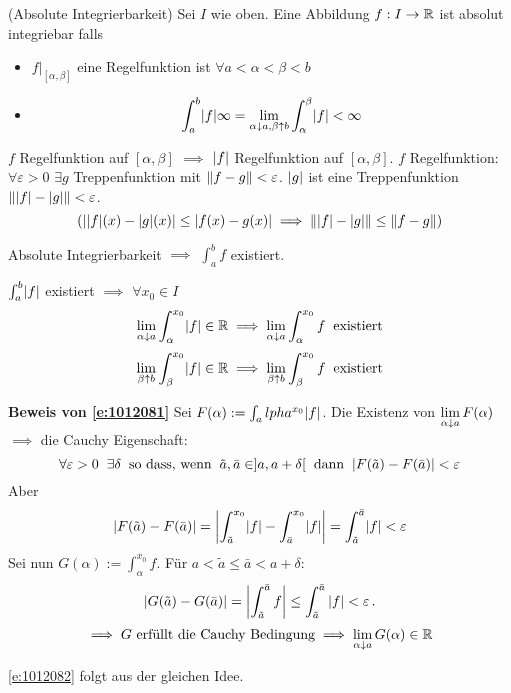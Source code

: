 \begin{Def}{(Absolute Integrierbarkeit)}
Sei $I$ wie oben. Eine Abbildung $f:I\to\mathbb{R}$  ist absolut integriebar falls
  \begin{itemize}
    \item $f|_{[\alpha,\beta]}$ eine Regelfunktion ist $\forall a<\alpha<\beta<b$
    \item 
      \[\int_a^b\mathopen| f \mathclose|\infty =\lim_{\alpha\downarrow a, \beta\uparrow b} \int_\alpha^\beta\mathopen| f \mathclose|
<\infty\]
  \end{itemize}
\end{Def}
\begin{Bem}
  $f$ Regelfunktion auf $[\alpha,\beta]$ $\implies$ $\mathopen| f \mathclose|$ Regelfunktion auf $[\alpha,\beta]$. $f$ Regelfunktion: $\forall \varepsilon>0$ $\exists g$ Treppenfunktion mit $\left\| f-g \right\|<\varepsilon$. $\mathopen| g \mathclose|$ ist eine Treppenfunktion $\left\| \mathopen| f \mathclose|-\mathopen| g \mathclose| \right\|<\varepsilon$.
  \[\left( \mathopen| \mathopen| f \mathclose|(x)-\mathopen| g \mathclose|(x) \mathclose|\leq\mathopen| f(x)-g(x) \mathclose|\implies \left\| \mathopen| f \mathclose|-\mathopen| g \mathclose| \right\|\leq\left\| f-g \right\| \right)\]
\end{Bem}
\begin{Sat}
  Absolute Integrierbarkeit $\implies$ $\int_a^b f$ existiert.
\end{Sat}
\begin{Bew}
  $\int_a^b\mathopen| f \mathclose|$ existiert $\implies$ $\forall x_0\in I$
  \begin{equation}\label{e:1012081}
    \displaystyle\lim_{\alpha\downarrow a}\int_\alpha^{x_0}\mathopen| f \mathclose|\in\mathbb{R}\implies\displaystyle\lim_{\alpha\downarrow a}
\int_\alpha^{x_0}f\hspace{2mm}\text{existiert}
  \end{equation}
  \begin{equation}\label{e:1012082}
    \displaystyle\lim_{\beta\uparrow b}\int_\beta^{x_0}\mathopen| f \mathclose|\in\mathbb{R}\implies\displaystyle\lim_{\beta\uparrow b}\int_\beta^{x_0}f\hspace{2mm}\text{existiert}
  \end{equation}

\medskip

{\bf Beweis von \eqref{e:1012081}} Sei $F(\alpha):=\int_alpha^{x_0}\mathopen| f \mathclose|$. Die
Existenz von $\displaystyle\lim_{\alpha\downarrow a} F(\alpha)$ $\implies$ die Cauchy Eigenschaft:
  \[\forall \varepsilon>0\hspace{2mm}\exists\delta\hspace{2mm}\text{so dass, wenn}\hspace{2mm}\tilde a,\bar a\in]a,a+\delta[\hspace{2mm}\text{dann}\hspace{2mm}\mathopen| F(\tilde a)-F(\bar a) \mathclose| < \varepsilon\]
Aber
  \[|F(\tilde a) - F(\bar a)| = \left|\int_{\tilde{a}}^{x_0}\mathopen| f \mathclose|-\int_{\bar{a}}^{x_0} \mathopen| f \mathclose|\right|
=\int_{\tilde{a}}^{\bar{a}}\mathopen| f \mathclose|<\varepsilon\]
Sei nun $G(\alpha):=\int_\alpha^{x_0}f$. F\"ur  $a<\tilde{a}\leq \bar{a}<a+\delta$:
\[
|G(\tilde a)- G (\bar a)|= \left|\int_{\tilde a}^{\bar a} f\right|
\leq \int_{\tilde a}^{\bar a} |f| <\varepsilon\, .
\]
\[\implies \text{$G$ erf\"ullt die Cauchy Bedingung}
\implies \displaystyle\lim_{\alpha\downarrow a}G(\alpha)\in\mathbb{R}\]

\medskip

\eqref{e:1012082} folgt aus der gleichen Idee.
\end{Bew}

